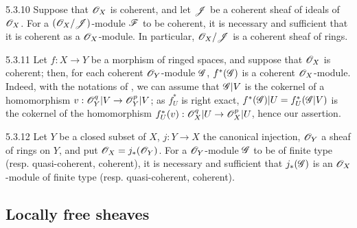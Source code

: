 \begin{env}{5.3.10}
\label{env-0.5.3.10}
Suppose that $\mathscr{O}_X$ is coherent, and let $\mathscr{J}$ be a coherent sheaf of ideals
of $\mathscr{O}_X$. For a $(\mathscr{O}_X/\mathscr{J})$-module $\mathscr{F}$ to be coherent, it is
necessary and sufficient that it is coherent as a $\mathscr{O}_X$-module. In particular,
$\mathscr{O}_X/\mathscr{J}$ is a coherent sheaf of rings.
\end{env}

\begin{env}{5.3.11}
\label{env-0.5.3.11}
Let $f:X\to Y$ be a morphism of ringed spaces, and suppose that $\mathscr{O}_X$ is
coherent; then, for each coherent $\mathscr{O}_Y$-module $\mathscr{G}$, $f^*(\mathscr{G})$ is a
coherent $\mathscr{O}_X$-module. Indeed, with the notations of , we can
assume that $\mathscr{G}|V$ is the cokernel of a homomorphism
$v:\mathscr{O}_Y^q|V\to\mathscr{O}_Y^p|V$; as $f_U^*$ is right exact,
$f^*(\mathscr{G})|U=f_U^*(\mathscr{G}|V)$ is the cokernel of the homomorphism
$f_U^*(v):\mathscr{O}_X^q|U\to\mathscr{O}_X^p|U$, hence our assertion.
\end{env}

\begin{env}{5.3.12}
\label{env-0.5.3.12}
Let $Y$ be a closed subset of $X$, $j:Y\to X$ the canonical injection, $\mathscr{O}_Y$ a
sheaf of rings on $Y$, and put $\mathscr{O}_X=j_*(\mathscr{O}_Y)$. For a $\mathscr{O}_Y$-module $\mathscr{G}$
to be of finite type (resp. quasi-coherent, coherent), it is necessary and
sufficient that $j_*(\mathscr{G})$ is an $\mathscr{O}_X$-module of finite type
(resp. quasi-coherent, coherent).
\end{env}

\subsection{Locally free sheaves}
\label{0-prelim-5.4}

